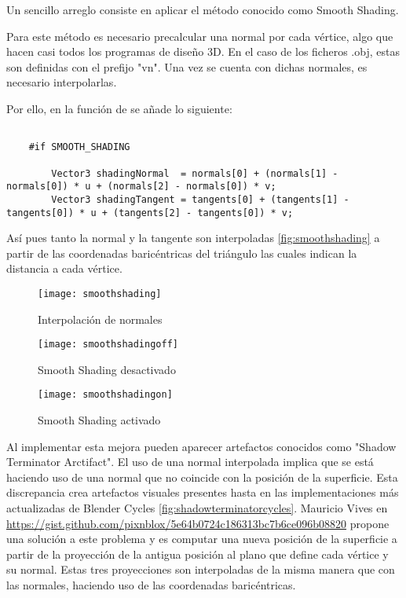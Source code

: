 Un sencillo arreglo consiste en aplicar el método conocido como Smooth Shading. 
	
Para este método es necesario precalcular una normal por cada vértice, algo que hacen casi todos los programas de diseño 3D. En el caso de los ficheros .obj, estas son definidas con el prefijo "vn". Una vez se cuenta con dichas normales, es necesario interpolarlas. 

Por ello, en la función  de  se añade lo siguiente:
	
\begin{lstlisting}
			
	#if SMOOTH_SHADING 

        Vector3 shadingNormal  = normals[0] + (normals[1] - normals[0]) * u + (normals[2] - normals[0]) * v;
        Vector3 shadingTangent = tangents[0] + (tangents[1] - tangents[0]) * u + (tangents[2] - tangents[0]) * v;

	\end{lstlisting}
			
Así pues tanto la normal y la tangente son interpoladas \autoref{fig:smoothshading} a partir de las coordenadas baricéntricas del triángulo  las cuales indican la distancia a cada vértice.
	
\begin{figure}[H]
    \centering
	\texttt{[image: smoothshading]}
	\caption{Interpolación de normales}
	\label{fig:smoothshading}
\end{figure}

\begin{figure}[H]
		\centering
		\begin{minipage}[b]{0.4\textwidth}
		\texttt{[image: smoothshadingoff]}
		\caption{Smooth Shading desactivado}
		\label{fig:smoothshadingoff}
	  \end{minipage}
	  \hfill
	  \begin{minipage}[b]{0.4\textwidth}
		\texttt{[image: smoothshadingon]}
		\caption{Smooth Shading activado}
		\label{fig:smoothshadingon}
	  \end{minipage}
	  	\hfill
\end{figure}


Al implementar esta mejora pueden aparecer artefactos conocidos como "Shadow Terminator Arctifact". El uso de una normal interpolada implica que se está haciendo uso de una normal que no coincide con la posición de la superficie. Esta discrepancia crea artefactos visuales presentes hasta en las implementaciones más actualizadas de Blender Cycles \autoref{fig:shadowterminatorcycles}. Mauricio Vives en \url{https://gist.github.com/pixnblox/5e64b0724c186313bc7b6ce096b08820} propone una solución a este problema y es computar una nueva posición de la superficie a partir de la proyección de la antigua posición al plano que define cada vértice y su normal. Estas tres proyecciones son interpoladas de la misma manera que con las normales, haciendo uso de las coordenadas baricéntricas.
	
